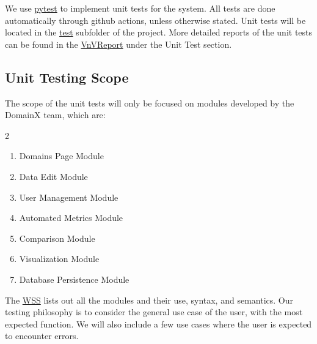 \documentclass[12pt, titlepage]{article}
\begin{document}
We use \href{https://docs.pytest.org/en/stable/}{pytest} to implement unit tests for the system. All tests are done automatically through github actions, unless otherwise stated.
Unit tests will be located in the \href{https://github.com/thaafei/DomainX/tree/main/test}{test} subfolder of the project. More detailed reports of the unit tests can be found in the \href{https://github.com/thaafei/DomainX/blob/main/docs/VnVReport/VnVReport.pdf}{VnVReport} under the Unit Test section.

\subsection{Unit Testing Scope}
The scope of the unit tests will only be focused on modules developed by the DomainX team, which are:
\begin{multicols}{2}
  \begin{enumerate}
    \item Domains Page Module
    \item Data Edit Module
    \item User Management Module
    \item Automated Metrics Module
    \item Comparison Module
    \item Visualization Module
    \item Database Persistence Module
  \end{enumerate}
\end{multicols}

The \href{https://github.com/thaafei/DomainX/blob/main/docs/Design/SoftDetailedDes/MIS.pdf}{WSS} lists out all the modules and their use, syntax, and semantics.
Our testing philosophy is to consider the general use case of the user, with the most expected function. We will also include a few use cases where the user is expected to encounter errors.
\end{document}
